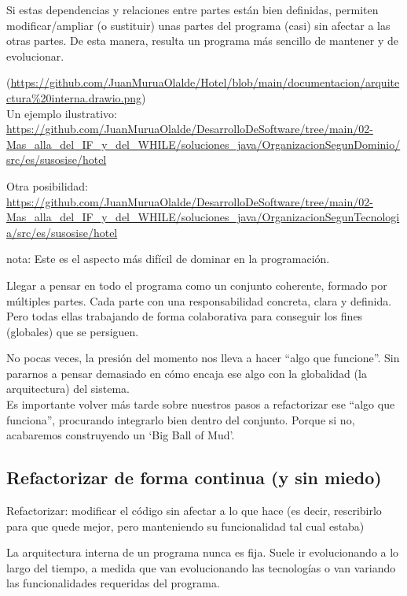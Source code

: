 \documentclass[spanish,12pt,a4paper,final,oneside]{book}
\begin{document}
Si estas dependencias y relaciones entre partes están bien definidas, permiten modificar/ampliar (o sustituir) unas partes del programa (casi) sin afectar a las otras partes. De esta manera, resulta un programa más sencillo de mantener y de evolucionar.

\vspace{0.2cm}
({\tiny \url{https://github.com/JuanMuruaOlalde/Hotel/blob/main/documentacion/arquitectura%20interna.drawio.png}}) 
\\Un ejemplo ilustrativo: {\tiny \url{https://github.com/JuanMuruaOlalde/DesarrolloDeSoftware/tree/main/02-Mas_alla_del_IF_y_del_WHILE/soluciones_java/OrganizacionSegunDominio/src/es/susosise/hotel}}

Otra posibilidad: {\tiny \url{https://github.com/JuanMuruaOlalde/DesarrolloDeSoftware/tree/main/02-Mas_alla_del_IF_y_del_WHILE/soluciones_java/OrganizacionSegunTecnologia/src/es/susosise/hotel}}

\vspace{0.5cm}
nota: Este es el aspecto más difícil de dominar en la programación. 

Llegar a pensar en todo el programa como un conjunto coherente, formado por múltiples partes. Cada parte con una responsabilidad concreta, clara y definida. Pero todas ellas trabajando de forma colaborativa para conseguir los fines (globales) que se persiguen.

No pocas veces, la presión del momento nos lleva a hacer ``algo que funcione''. Sin pararnos a pensar demasiado en cómo encaja ese algo con la globalidad (la arquitectura) del sistema. 
\\Es importante volver más tarde sobre nuestros pasos a refactorizar ese ``algo que funciona'', procurando integrarlo bien dentro del conjunto. 
Porque si no, acabaremos construyendo un `Big Ball of Mud'.


\subsection{Refactorizar de forma continua (y sin miedo)}

Refactorizar: modificar el código sin afectar a lo que hace (es decir, rescribirlo para que quede mejor, pero manteniendo su funcionalidad tal cual estaba)

La arquitectura interna de un programa nunca es fija. Suele ir evolucionando a lo largo del tiempo, a medida que van evolucionando las tecnologías o van variando las funcionalidades requeridas del programa.
\end{document}
